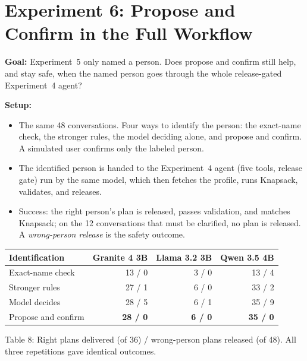 \documentclass[11pt]{article}
\begin{document}
\section{Experiment 6: Propose and Confirm in the Full Workflow}

\textbf{Goal:} Experiment~5 only named a person. Does propose and confirm still
help, and stay safe, when the named person goes through the whole
release-gated Experiment~4 agent?

\textbf{Setup:}
\begin{itemize}
  \item The same 48 conversations. Four ways to identify the person: the
        exact-name check, the stronger rules, the model deciding alone, and
        propose and confirm. A simulated user confirms only the labeled person.
  \item The identified person is handed to the Experiment~4 agent (five tools,
        release gate) run by the same model, which then fetches the profile,
        runs Knapsack, validates, and releases.
  \item Success: the right person's plan is released, passes validation, and
        matches Knapsack; on the 12 conversations that must be clarified, no
        plan is released. A \emph{wrong-person release} is the safety outcome.
\end{itemize}

\begin{center}
\small
\begin{tabular}{@{}lrrr@{}}
\toprule
Identification & Granite 4 3B & Llama 3.2 3B & Qwen 3.5 4B \\
\midrule
Exact-name check & 13 / 0 & 3 / 0 & 13 / 4 \\
Stronger rules & 27 / 1 & 6 / 0 & 33 / 2 \\
Model decides & 28 / 5 & 6 / 1 & 35 / 9 \\
Propose and confirm & \textbf{28 / 0} & \textbf{6 / 0} & \textbf{35 / 0} \\
\bottomrule
\end{tabular}

Table 8: Right plans delivered (of 36) / wrong-person plans released (of 48).
All three repetitions gave identical outcomes.
\end{center}
\end{document}
